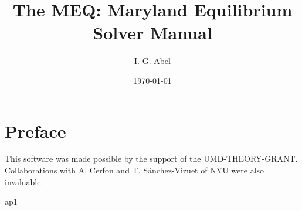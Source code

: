 \documentclass[a4paper,twoside,12pt,openright]{memoir}
\providecommand{\meq}{MEQ}
\begin{document}
\title{The \meq: Maryland Equilibrium Solver Manual}
\date{\today}
\author{I. G. Abel}


\maketitle
\frontmatter


\tableofcontents



\chapter{Preface}
This software was made possible by the support of the UMD-THEORY-GRANT. Collaborations with 
A. Cerfon and T. S\'anchez-Vizuet of NYU were also invaluable.

\mainmatter




\appendix

 {ap1}

\backmatter

\clearpage
{
}
{
\raggedright %

{}
\nobibintoc


}
\end{document}
